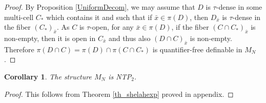 \documentclass[12pt]{article}
\newtheorem{cor}[thm]{Corollary}
\theoremstyle{definition}
\theoremstyle{mystyle}
\theoremstyle{remark}
\newtheorem*{claim}{Claim}
\newcommand{\clos}[2]{#1^{(#2)}}
\begin{document}
\begin{proof}
By Proposition \ref{UniformDecom}, we may assume that $D$ is $\tau$-dense in some multi-cell $C_*$ which contains it and such that if $\bar x \in \pi(D)$, then $D_{\bar x}$ is $\tau$-dense in the fiber $(C_*)_{\bar x}$. As $C$ is $\tau$-open, for any $\bar x\in \pi(D)$, if the fiber $(C\cap C_*)_{\bar x}$ is non-empty, then it is open in $C_{\bar x}$ and thus also $(D \cap C)_{\bar x}$ is non-empty. Therefore $\pi(D\cap C)=  \pi(D)\cap \pi(C\cap C_*)$ is quantifier-free definable in $M_N$.
%
%
%
%
%
%
\end{proof}

\begin{cor}\label{ShelahExpNTP}
The structure $M_N$ is NTP$_2$.
\end{cor}
\begin{proof}
This follows from Theorem \ref{th_shelahexp} proved in appendix.
\end{proof}
\end{document}
